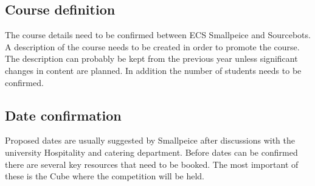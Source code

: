 \subsection{Course definition}

The course details need to be confirmed between ECS Smallpeice and Sourcebots.
A description of the course needs to be created in order to promote the course.
The description can probably be kept from the previous year unless significant changes in content are planned.
In addition the number of students needs to be confirmed.


\subsection{Date confirmation}

Proposed dates are usually suggested by Smallpeice after discussions with the university Hospitality and catering department.
Before dates can be confirmed there are several key resources that need to be booked.
The most important of these is the Cube where the competition will be held.

